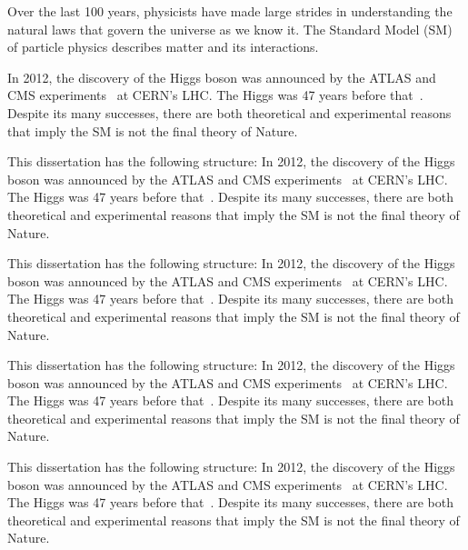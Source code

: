 

\label{sec:introduction}

Over the last 100 years, physicists have made large strides in understanding the natural laws that govern the universe as we know it. The Standard Model (SM) of particle physics describes matter and its interactions.

In 2012, the discovery of the Higgs boson was announced by the ATLAS and CMS experiments~\cite{Higgs_discovery_2012_CMS,Higgs_discovery_2012_ATLAS,Higgs_discovery_2013_CMS} at CERN's LHC.
The Higgs was 47 years before that~\cite{Higgs_theory1,Higgs_theory2}.
Despite its many successes, there are both theoretical and experimental reasons that imply the SM is not the final theory of Nature.

This dissertation has the following structure:
In 2012, the discovery of the Higgs boson was announced by the ATLAS and CMS experiments~\cite{Higgs_discovery_2012_CMS,Higgs_discovery_2012_ATLAS,Higgs_discovery_2013_CMS} at CERN's LHC.
The Higgs was 47 years before that~\cite{Higgs_theory1,Higgs_theory2}.
Despite its many successes, there are both theoretical and experimental reasons that imply the SM is not the final theory of Nature.

This dissertation has the following structure:
In 2012, the discovery of the Higgs boson was announced by the ATLAS and CMS experiments~\cite{Higgs_discovery_2012_CMS,Higgs_discovery_2012_ATLAS,Higgs_discovery_2013_CMS} at CERN's LHC.
The Higgs was 47 years before that~\cite{Higgs_theory1,Higgs_theory2}.
Despite its many successes, there are both theoretical and experimental reasons that imply the SM is not the final theory of Nature.

This dissertation has the following structure:
In 2012, the discovery of the Higgs boson was announced by the ATLAS and CMS experiments~\cite{Higgs_discovery_2012_CMS,Higgs_discovery_2012_ATLAS,Higgs_discovery_2013_CMS} at CERN's LHC.
The Higgs was 47 years before that~\cite{Higgs_theory1,Higgs_theory2}.
Despite its many successes, there are both theoretical and experimental reasons that imply the SM is not the final theory of Nature.

This dissertation has the following structure:
In 2012, the discovery of the Higgs boson was announced by the ATLAS and CMS experiments~\cite{Higgs_discovery_2012_CMS,Higgs_discovery_2012_ATLAS,Higgs_discovery_2013_CMS} at CERN's LHC.
The Higgs was 47 years before that~\cite{Higgs_theory1,Higgs_theory2}.
Despite its many successes, there are both theoretical and experimental reasons that imply the SM is not the final theory of Nature.

